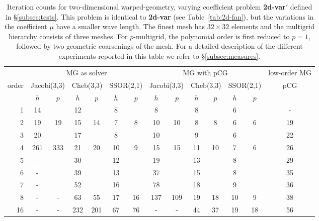 \documentclass[times]{nlaauth}
\begin{document}
\begin{table}
  \caption{\label{tab:2d-fan2} Iteration counts for two-dimensional
    warped-geometry, varying coefficient problem {\bf 2d-var$'$}
    defined in \S\ref{subsec:tests}. This problem is identical to {\bf
      2d-var} (see Table~\ref{tab:2d-fan}),
    but the variations in the coefficient $\mu$ have a smaller wave length.
    The finest
    mesh has $32\times 32$ elements and the multigrid hierarchy
    consists of three meshes.  For $p$-multigrid, the
    polynomial order is first reduced to $p=1$, followed by two
    geometric coarsenings of the mesh.
    For a detailed description of the different experiments
    reported in this table we refer to \S\ref{subsec:measures}.} 
  \centering
  \begin{tabular}{|r|c c|c c|c c||c c|c c|c c||c|} 
    \hline
    & \multicolumn{6}{c||}{MG as solver} & \multicolumn{6}{c||}{MG
      with pCG} & \!\!low-order MG\!\! \\
    \cline{2-13}
    \!\!\! order \!\!\!\! &  \multicolumn{2}{c|}{\!\!\scriptsize  Jacobi(3,3)\!\!} &  \multicolumn{2}{c|}{\!\!\scriptsize Cheb(3,3)\!\!} & \multicolumn{2}{c||}{\!\!\scriptsize  SSOR(2,1)\!\!} & \multicolumn{2}{c|}{\!\!\scriptsize Jacobi(3,3)\!\!} &  \multicolumn{2}{c|}{\!\!\scriptsize Cheb(3,3)\!\!} & \multicolumn{2}{c||}{\!\!\scriptsize SSOR(2,1)\!\!} & pCG \\
\hline
 & $h$ & $p$ & $h$ & $p$& $h$ & $p$& $h$ & $p$& $h$ & $p$& $h$ & $p$& ~ \\
 \cline{2-13}
					1 & 14 & & 12 & & 8 & & 8 & & 8 & & 6 & & -  \\
					2 & 19 & 19 & 15 & 14 & 7 & 8 & 10 & 10 & 8 & 8 & 6 & 6 & 19 \\
					3 & 20 & & 17 & & 8 & & 10 & & 9 & & 6 & & 22  \\
					4 & 261 & 333 & 21 & 20 & 10 & 9 & 15 & 15 & 11 & 10 & 7 & 6 & 26  \\
					5 & - & & 30 & & 12 & & 19 & & 13 & & 8 & &  29  \\
					6 & - & & 39 & & 13 & & 37 & & 15 & & 8 & &  35  \\
					7 & - & & 52 & & 16 & & 78 & & 18 & & 9 & &  36  \\
					8 & - & - & 63 & 55   & 17 & 16 & 137 & 109 & 19 & 18 & 10 & 9  & 38 \\
				 16 & - & - & 232 & 201 & 67 & 76 &  -  &  -  & 44 & 37 & 19 & 18 & 56 \\
\hline
  \end{tabular}
\end{table}
\end{document}
